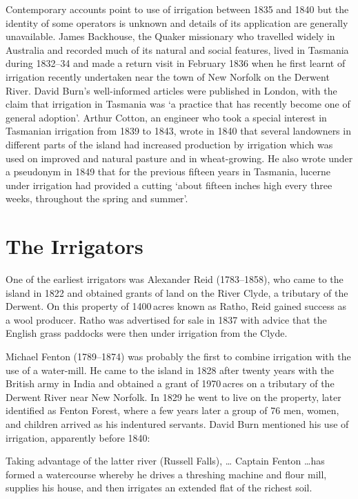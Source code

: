 Contemporary accounts point to use of irrigation between 1835 and 1840
but the identity of some operators is unknown and details of its
application are generally unavailable.  James
Backhouse, the Quaker missionary who travelled
widely in Australia and recorded much of its natural and social
features, lived in Tasmania during 1832--34 and made a return visit in
February 1836 when he first learnt of irrigation recently undertaken
near the town of New Norfolk on the Derwent
River. David Burn's well-informed
articles were published in London, with the claim that irrigation in
Tasmania was `a practice that has recently become one of general
adoption'.  Arthur Cotton, an engineer who took a
special interest in Tasmanian irrigation from 1839 to 1843, wrote in
1840 that several landowners in different parts of the island had
increased production by irrigation which was used on improved and
natural pasture and in wheat-growing.  He
also wrote under a pseudonym in 1849 that for the previous fifteen
years in Tasmania, lucerne under irrigation had
provided a cutting `about fifteen inches high every three weeks,
throughout the spring and summer'.

\section*{The Irrigators}

One of the earliest irrigators was Alexander Reid
(1783--1858), who came to the island in 1822 and obtained grants of
land on the River Clyde, a tributary of the
Derwent. On this property of 1400\,acres known as Ratho, Reid gained success as a wool producer.  Ratho was
advertised for sale in 1837 with advice that the English grass
paddocks were then under irrigation from the Clyde.

Michael Fenton (1789--1874) was probably the first
to combine irrigation with the use of a water-mill.
 He came to the island in 1828 after
twenty years with the British army in India and obtained a grant of
1970\,acres on a tributary of the Derwent River near New
Norfolk. In 1829 he went to live on the
property, later identified as Fenton Forest, where a few years later a
group of 76 men, women, and children arrived as his indentured
servants.  David Burn mentioned his use of irrigation, apparently
before 1840:
\begin{Quote}
	Taking advantage of the latter river (Russell Falls), \ldots
	Captain Fenton \ldots has formed a watercourse whereby he
	drives a threshing machine and flour mill, supplies his house,
	and then irrigates an extended flat of the richest
	soil.
\end{Quote}

